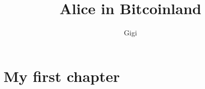 \documentclass{tufte-book}[a4paper,twoside]
\title{Alice in Bitcoinland}
\author{Gigi}
\begin{document}
\frontmatter

\maketitle

\cleardoublepage

\chapter{My first chapter}

\lipsum[5]
\end{document}
